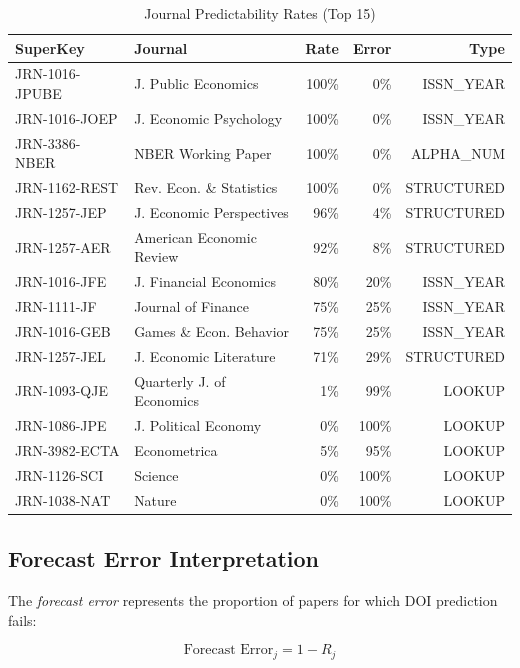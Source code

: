 \begin{table}[h]
\centering
\caption{Journal Predictability Rates (Top 15)}
\label{tab:predictability}
\begin{tabular}{llrrr}
\toprule
\textbf{SuperKey} & \textbf{Journal} & \textbf{Rate} & \textbf{Error} & \textbf{Type} \\
\midrule
JRN-1016-JPUBE & J. Public Economics & 100\% & 0\% & ISSN\_YEAR \\
JRN-1016-JOEP & J. Economic Psychology & 100\% & 0\% & ISSN\_YEAR \\
JRN-3386-NBER & NBER Working Paper & 100\% & 0\% & ALPHA\_NUM \\
JRN-1162-REST & Rev. Econ. \& Statistics & 100\% & 0\% & STRUCTURED \\
JRN-1257-JEP & J. Economic Perspectives & 96\% & 4\% & STRUCTURED \\
JRN-1257-AER & American Economic Review & 92\% & 8\% & STRUCTURED \\
JRN-1016-JFE & J. Financial Economics & 80\% & 20\% & ISSN\_YEAR \\
JRN-1111-JF & Journal of Finance & 75\% & 25\% & ISSN\_YEAR \\
JRN-1016-GEB & Games \& Econ. Behavior & 75\% & 25\% & ISSN\_YEAR \\
JRN-1257-JEL & J. Economic Literature & 71\% & 29\% & STRUCTURED \\
\midrule
JRN-1093-QJE & Quarterly J. of Economics & 1\% & 99\% & LOOKUP \\
JRN-1086-JPE & J. Political Economy & 0\% & 100\% & LOOKUP \\
JRN-3982-ECTA & Econometrica & 5\% & 95\% & LOOKUP \\
JRN-1126-SCI & Science & 0\% & 100\% & LOOKUP \\
JRN-1038-NAT & Nature & 0\% & 100\% & LOOKUP \\
\bottomrule
\end{tabular}
\end{table}

\subsection{Forecast Error Interpretation}

The \emph{forecast error} represents the proportion of papers for which DOI prediction fails:

\begin{equation}
\text{Forecast Error}_j = 1 - R_j
\end{equation}

